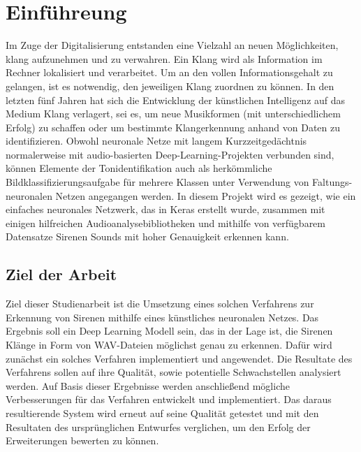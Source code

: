 \documentclass[a4paper,11pt]{article}
\theoremstyle{mytheor}
\begin{document}
\section{Einführeung}
Im Zuge der Digitalisierung entstanden eine Vielzahl an neuen Möglichkeiten, klang aufzunehmen und zu verwahren. Ein Klang wird als Information im Rechner lokalisiert und verarbeitet. Um an den vollen Informationsgehalt zu
gelangen, ist es notwendig, den jeweiligen Klang zuordnen zu können.
In den letzten fünf Jahren hat sich die Entwicklung der künstlichen Intelligenz auf das Medium Klang verlagert, sei es, um neue Musikformen (mit unterschiedlichem Erfolg) zu schaffen oder um bestimmte Klangerkennung anhand von Daten zu identifizieren. 
Obwohl neuronale Netze mit langem Kurzzeitgedächtnis normalerweise mit audio-basierten Deep-Learning-Projekten verbunden sind, können Elemente der Tonidentifikation auch als herkömmliche Bildklassifizierungsaufgabe für mehrere Klassen unter Verwendung von Faltungs-neuronalen Netzen angegangen werden.
In diesem Projekt wird es gezeigt, wie ein einfaches neuronales Netzwerk, das in Keras erstellt wurde, zusammen mit einigen hilfreichen Audioanalysebibliotheken und mithilfe von verfügbarem Datensatze Sirenen Sounds mit hoher Genauigkeit erkennen kann.
\subsection{Ziel der Arbeit}
Ziel dieser Studienarbeit ist die Umsetzung eines solchen Verfahrens zur
Erkennung von Sirenen mithilfe eines künstliches neuronalen Netzes. 
Das Ergebnis soll ein Deep Learning Modell sein, das in
der Lage ist, die Sirenen Klänge in Form von WAV-Dateien möglichst genau zu erkennen. Dafür wird zunächst ein solches Verfahren implementiert und angewendet. Die Resultate des Verfahrens sollen auf ihre Qualität, sowie potentielle Schwachstellen analysiert werden. Auf Basis dieser Ergebnisse werden anschließend mögliche Verbesserungen für das Verfahren entwickelt und implementiert. Das daraus resultierende System wird
erneut auf seine Qualität getestet und mit den Resultaten des ursprünglichen
Entwurfes verglichen, um den Erfolg der Erweiterungen bewerten zu können.
\end{document}
